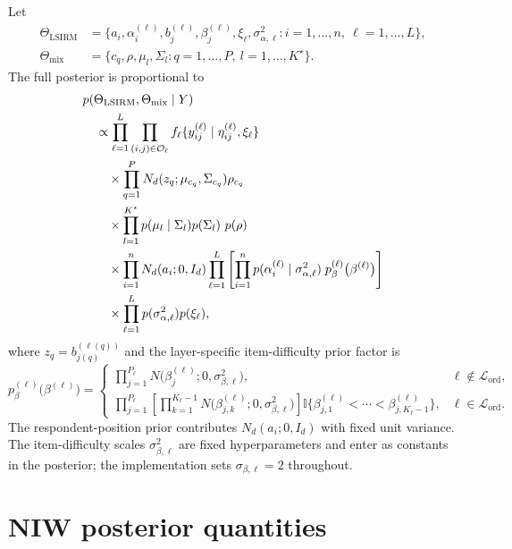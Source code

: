 \documentclass[11pt]{article}
\newcommand{\ind}{\mathbb I}
\begin{document}
Let
\begin{align*}
    \Theta_{\mathrm{LSIRM}}
    &=
    \{a_i,\alpha_i^{(\ell)},b_j^{(\ell)},\beta_j^{(\ell)},\xi_\ell,
    \sigma_{\alpha,\ell}^2:
    i=1,\dots,n,\ \ell=1,\dots,L\},\\
    \Theta_{\mathrm{mix}}
    &=
    \{c_q,\rho,\mu_l,\Sigma_l:q=1,\dots,P,\ l=1,\dots,K^\star\}.
\end{align*}
The full posterior is proportional to
\begin{align}
&p(\Theta_{\mathrm{LSIRM}},\Theta_{\mathrm{mix}}\mid Y)
\notag\\
&\quad \propto
\prod_{\ell=1}^L
\prod_{(i,j)\in\mathcal O_\ell}
    f_\ell\{y_{ij}^{(\ell)}\mid \eta_{ij}^{(\ell)},\xi_\ell\}
\notag\\
&\qquad\times
\prod_{q=1}^P
    N_d(z_q;\mu_{c_q},\Sigma_{c_q})\rho_{c_q}
\notag\\
&\qquad\times
\prod_{l=1}^{K^\star}
    p(\mu_l\mid\Sigma_l)p(\Sigma_l)
    \ p(\rho)
\notag\\
&\qquad\times
\prod_{i=1}^{n}N_d(a_i;0,I_d)
\prod_{\ell=1}^L
\left[
\prod_{i=1}^{n}p(\alpha_i^{(\ell)}\mid\sigma_{\alpha,\ell}^2)
\;p_\beta^{(\ell)}\bigl(\beta^{(\ell)}\bigr)
\right]
\notag\\
&\qquad\times
\prod_{\ell=1}^L
    p(\sigma_{\alpha,\ell}^2)p(\xi_\ell),
    \label{eq:full-posterior}
\end{align}
where $z_q=b_{j(q)}^{(\ell(q))}$ and the layer-specific item-difficulty prior
factor is
\[
    p_\beta^{(\ell)}\bigl(\beta^{(\ell)}\bigr)
    =
    \begin{cases}
    \displaystyle\prod_{j=1}^{P_\ell} N\!\bigl(\beta_j^{(\ell)};0,\sigma_{\beta,\ell}^2\bigr),
    & \ell\notin\mathcal L_{\mathrm{ord}},\\[1em]
    \displaystyle\prod_{j=1}^{P_\ell}
    \left[
    \prod_{k=1}^{K_\ell-1}
    N\!\bigl(\beta_{j,k}^{(\ell)};0,\sigma_{\beta,\ell}^2\bigr)
    \right]
    \ind\bigl\{\beta_{j,1}^{(\ell)}<\cdots<\beta_{j,K_\ell-1}^{(\ell)}\bigr\},
    & \ell\in\mathcal L_{\mathrm{ord}}.
    \end{cases}
\]
The respondent-position prior contributes $N_d(a_i;0,I_d)$ with fixed unit
variance.  The item-difficulty scales $\sigma_{\beta,\ell}^2$ are fixed
hyperparameters and enter as constants in the posterior; the implementation
sets $\sigma_{\beta,\ell}=2$ throughout.

\section{NIW posterior quantities}
\end{document}

